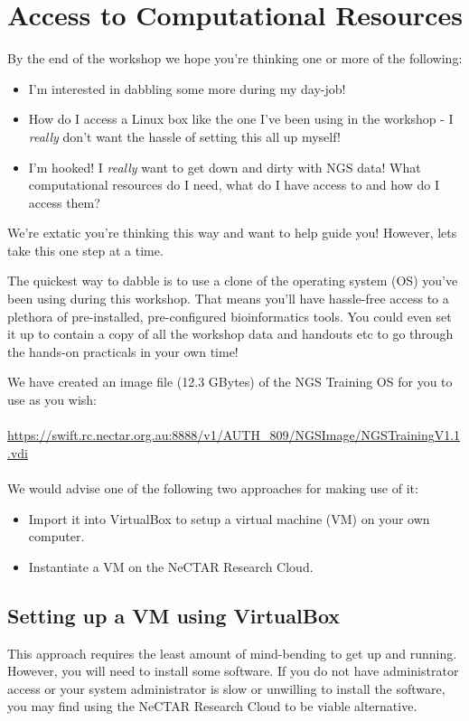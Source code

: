 \section{Access to Computational Resources}

By the end of the workshop we hope you're thinking one or more of the following:

\begin{itemize}
\item I'm interested in dabbling some more during my day-job!
\item How do I access a Linux box like the one I've been using in the workshop -
I \emph{really} don't want the hassle of setting this all up myself!
\item I'm hooked! I \emph{really} want to get down and dirty with NGS data! What
computational resources do I need, what do I have access to and how do I access
them?
\end{itemize}

We're extatic you're thinking this way and want to help guide you! However, lets
take this one step at a time.

The quickest way to dabble is to use a clone of the operating system (OS) you've
been using during this workshop. That means you'll have hassle-free access to a
plethora of pre-installed, pre-configured bioinformatics tools. You could even set it
up to contain a copy of all the workshop data and handouts etc to go through the
hands-on practicals in your own time!

We have created an image file (12.3 GBytes) of the NGS Training OS for you to
use as you wish:
\\\\
\url{https://swift.rc.nectar.org.au:8888/v1/AUTH_809/NGSImage/NGSTrainingV1.1.vdi}
\\\\
We would advise one of the following two approaches for making use of it:

\begin{itemize}
\item Import it into VirtualBox to setup a virtual machine (VM) on your own
computer.
\item Instantiate a VM on the NeCTAR Research Cloud.
\end{itemize}

\subsection{Setting up a VM using VirtualBox}
This approach requires the least amount of mind-bending to get up and running.
However, you will need to install some software. If you do not have
administrator access or your system administrator is slow or unwilling to
install the software, you may find using the NeCTAR Research Cloud to be viable
alternative.

